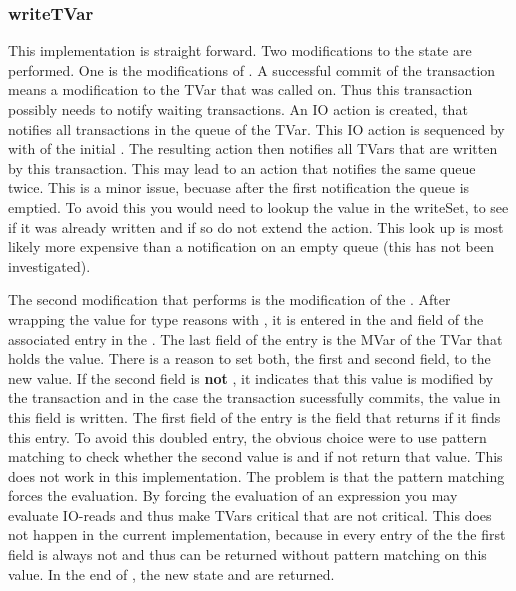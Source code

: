 \subsubsection{writeTVar}
This implementation is straight forward. Two modifications to the state are performed. One is
the modifications of . A successful commit of the transaction means a 
modification to the TVar that  was called on. Thus this transaction 
possibly needs to notify waiting transactions. An IO action is created, that notifies
all transactions in the queue of the TVar. This IO action is sequenced by \code{>>} with 
 of the initial . The resulting action then notifies all
TVars that are written by this transaction. This may lead to an action that notifies the 
same queue twice. This is a minor issue, becuase after the first notification the queue 
is emptied. To avoid this you would need to lookup the value in the writeSet, to see if 
it was already written and if so do not extend the  action. This look up
is most likely more expensive than a notification on an empty queue (this has not been 
investigated). 

The second modification that  performs is the modification of the .
After wrapping the value for type reasons with , it is entered in the  and  
field of the associated entry in the . The last field of the entry is the MVar of
the TVar that holds the value. There is a reason to set both, the first and second field, to the
new value. If the second field is \textbf{not} , it indicates that this value is modified 
by the transaction and in the case the transaction sucessfully commits, the value in this field
is written. The first field of the entry is the field that  returns if it finds
this entry. To avoid this doubled entry, the obvious choice were to use pattern matching to 
check whether the second value is  and if not return that value. This does not
work in this implementation. The problem is that the pattern matching forces the evaluation.
By forcing the evaluation of an expression you may evaluate IO-reads and thus make TVars critical
that are not critical. This does not happen in the current implementation, because in every entry
of the  the first field is always not  and thus can be returned
without pattern matching on this value. 
In the end of , the new state and \code{()} are returned.

